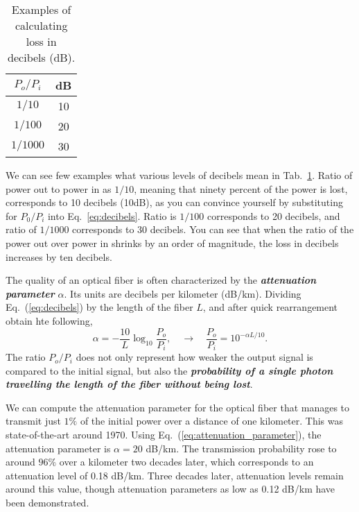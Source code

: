 \begin{table}
    \setcellgapes{3pt}
    \renewcommand\theadfont{}
    \makegapedcells
    \centering
    \begin{tabular}{cc}
        \hline
        \boldmath$P_o/P_i$ & \textbf{dB} \\
        \hline $1/10$ & 10 \\
        $1/100$ & 20 \\
        $1/1000$ & 30 \\
        \hline
    \end{tabular}
    \caption[Decibels example.]{Examples of calculating loss in decibels (dB).}
    \label{tab:decibels}
\end{table}

We can see few examples what various levels of decibels mean in Tab.~\ref{tab:decibels}.
Ratio of power out to power in as $1/10$, meaning that ninety percent of the power is lost, corresponds to 10 decibels (10dB), as you can convince yourself by substituting for $P_0/P_i$ into Eq.~\ref{eq:decibels}.
Ratio is $1/100$ corresponds to 20 decibels, and ratio of $1/1000$ corresponds to 30 decibels.
You can see that when the ratio of the power out over power in shrinks by an order of magnitude, the loss in decibels increases by ten decibels.

The quality of an optical fiber is often characterized by the \textbf{\emph{attenuation parameter}} $\alpha$.
Its units are decibels per kilometer (dB/km).
Dividing Eq.~(\ref{eq:decibels}) by the length of the fiber $L$, and after quick rearrangement obtain hte following,
\begin{equation}
    \alpha = -\frac{10}{L} \log _{10} \frac{P_o}{P_i}, \quad \rightarrow \quad \frac{P_o}{P_i} = 10^{-\alpha L / 10}.
    \label{eq:attenuation_parameter}
\end{equation}
The ratio $P_o/P_i$ does not only represent how weaker the output signal is compared to the initial signal, but also the \textbf{\emph{probability of a single photon travelling the length of the fiber without being lost}}.

We can compute the attenuation parameter for the optical fiber that manages to transmit just $1\%$ of the initial power over a distance of one kilometer.
This was state-of-the-art around 1970.
Using Eq.~(\ref{eq:attenuation_parameter}), the attenuation parameter is $\alpha=20$ dB/km.
The transmission probability rose to around $96\%$ over a kilometer two decades later, which corresponds to an attenuation level of 0.18 dB/km. Three decades later, attenuation levels remain around this value, though attenuation parameters as low as 0.12 dB/km have been demonstrated.

